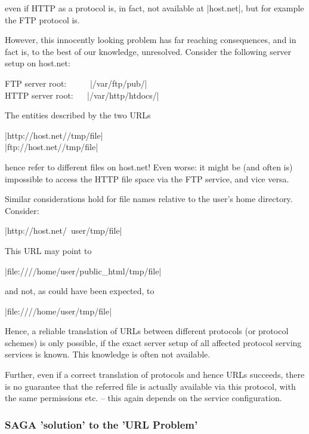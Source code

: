   even if HTTP as a protocol is, in fact, not available
  at |host.net|, but for example the FTP protocol is.

  However, this innocently looking problem has far reaching
  consequences, and in fact is, to the best of our knowledge,
  unresolved.  Consider the following server setup on host.net:

    \shift FTP  server root: ~~~~\, |/var/ftp/pub/| \\
    \shift HTTP server root: ~~ |/var/http/htdocs/|

  The entities described by the two URLs

    \shift |http://host.net//tmp/file|\\
    \shift |ftp://host.net//tmp/file|

  hence refer to different files on host.net!  Even worse: it
  might be (and often is) impossible to access the HTTP file
  space via the FTP service, and vice versa.

  Similar considerations hold  for file names relative to the user's home directory.
  Consider:

    \shift |http://host.net/~user/tmp/file|

  This URL may point to

    \shift |file:////home/user/public_html/tmp/file|

  and not, as could have been expected, to

    \shift |file:////home/user/tmp/file|

  Hence, a reliable translation of URLs between different
  protocols (or protocol schemes) is only possible, if
  the exact server setup of all affected protocol serving
  services is known.  This knowledge is often not available.

  Further, even if a correct translation of protocols and hence
  URLs succeeds, there is no guarantee that the referred file is
  actually available via this protocol, with the same
  permissions etc. -- this again depends on the service
  configuration.


  \subsubsection*{SAGA 'solution' to the 'URL Problem'}

